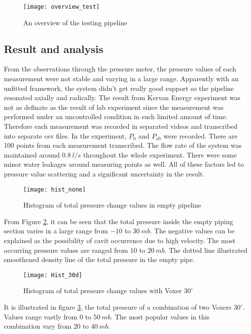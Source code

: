 \begin{figure}[h]
  \centering
  \texttt{[image: overview\_test]}
  \caption{ An overview of the testing pipeline}
  \label{fig:overview}
\end{figure}

\subsection{Result and analysis}

From the observations through the pressure meter, the pressure values of each measurement were not stable and varying in a large range. Apparently with an unfitted framework, the system didn't get really good support so the pipeline resonated axially and radically. The result from Kervan Energy experiment was not as definate as the result of lab experiment since the measurement was performed under an uncontrolled condition in such limited amount of time. Therefore each measurement was recorded in separated videos and transcribed into separate \gls{csv} files. In the experiment, $P_{\text{b}}$ and $P_{\text{ab}}$ were recorded. There are 100 points from each measurement transcribed. The flow rate of the system was maintained around $0.8\ l/s$ throughout the whole experiment. There were some minor water leakages around measuring points as well. All of these factors led to pressure value scattering and a significant uncertainty in the result.

\begin{figure}[h]
  \centering
  \texttt{[image: hist\_none]}
  \caption{ Histogram of total pressure change values in empty pipeline}
  \label{fig:histnone}
\end{figure}

From Figure \ref{fig:histnone}, it can be seen that the total pressure inside the empty piping section varies in a large range from $-10$ to $30\ mb$. The negative values can be explained as the possibility of \gls{cavit} occurrence due to high velocity. The most occurring pressure values are ranged from $10$ to $20\ mb$. The dotted line illustrated smoothened density line of the total pressure in the empty pipe. 

\begin{figure}[h]
  \centering
  \texttt{[image: Hist\_30d]}
  \caption{ Histogram of total pressure change values with Voxer $30^{\circ}$}
  \label{fig:hist30d}
\end{figure}

It is illustrated in figure \ref{fig:hist30d}, the total pressure of a combination of two Voxers $30^{\circ}$. Values range vastly from $0$ to $50\ mb$. The most popular values in this combination vary from $20$ to $40\ mb$.

